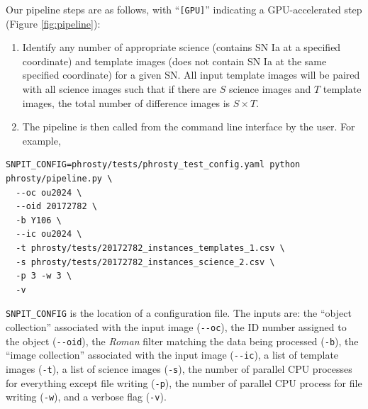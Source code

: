 \documentclass[10pt,a4paper,onecolumn]{article}
\providecommand{\tightlist}{%
  \setlength{\itemsep}{0pt}\setlength{\parskip}{0pt}}
\begin{document}
Our pipeline steps are as follows, with ``\texttt{{[}GPU{]}}''
indicating a GPU-accelerated step (Figure \ref{fig:pipeline}):

\begin{enumerate}
\def\labelenumi{\arabic{enumi}.}
\tightlist
\item
  Identify any number of appropriate science (contains SN Ia at a
  specified coordinate) and template images (does not contain SN Ia at
  the same specified coordinate) for a given SN. All input template
  images will be paired with all science images such that if there are
  \(S\) science images and \(T\) template images, the total number of
  difference images is \(S \times T\).
\item
  The pipeline is then called from the command line interface by the
  user. For example,
\end{enumerate}

\begin{verbatim}
SNPIT_CONFIG=phrosty/tests/phrosty_test_config.yaml python phrosty/pipeline.py \
  --oc ou2024 \
  --oid 20172782 \
  -b Y106 \
  --ic ou2024 \
  -t phrosty/tests/20172782_instances_templates_1.csv \
  -s phrosty/tests/20172782_instances_science_2.csv \
  -p 3 -w 3 \
  -v
\end{verbatim}

\texttt{SNPIT\_CONFIG} is the location of a configuration file. The
inputs are: the ``object collection'' associated with the input image
(\texttt{-\/-oc}), the ID number assigned to the object
(\texttt{-\/-oid}), the \emph{Roman} filter matching the data being
processed (\texttt{-b}), the ``image collection'' associated with the
input image (\texttt{-\/-ic}), a list of template images (\texttt{-t}),
a list of science images (\texttt{-s}), the number of parallel CPU
processes for everything except file writing (\texttt{-p}), the number
of parallel CPU process for file writing (\texttt{-w}), and a verbose
flag (\texttt{-v}).
\end{document}
